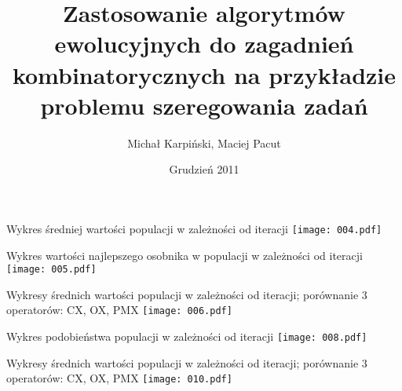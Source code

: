 \documentclass{beamer}
\title{Zastosowanie algorytmów ewolucyjnych do zagadnień kombinatorycznych na przykładzie problemu szeregowania zadań}
\author{Michał Karpiński, Maciej Pacut}
\date{Grudzień 2011}
\begin{document}
\maketitle

\begin{frame}{Wykres średniej wartości populacji w zależności od iteracji}
  \texttt{[image: 004.pdf]}
\end{frame}

\begin{frame}{Wykres wartości najlepszego osobnika w populacji w
    zależności od iteracji}
  \texttt{[image: 005.pdf]}
\end{frame}

\begin{frame}{Wykresy średnich wartości populacji w zależności od
    iteracji; porównanie 3 operatorów: CX, OX, PMX}
  \texttt{[image: 006.pdf]}
\end{frame}

\begin{frame}{Wykres podobieństwa populacji w zależności od iteracji}
  \texttt{[image: 008.pdf]}
\end{frame}


\begin{frame}{Wykresy średnich wartości populacji w zależności od
    iteracji; porównanie 3 operatorów: CX, OX, PMX}
  \texttt{[image: 010.pdf]}
\end{frame}
\end{document}
